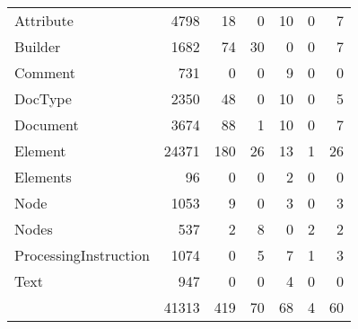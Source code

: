 \begin{tabular}{|l|r|r|r||r|r|r|}\hline
\typeHeading				& \successHeading & \failureHeading &\errorHeading &\successOnlyHeading	& \nonSuccessOnlyHeading 	& \mixedHeading\\\hline\hline
Attribute		& 4798	& 18	& 0	& 10	& 0	& 7\\\hline
Builder		& 1682	& 74	& 30	& 0	& 0	& 7\\\hline
Comment		& 731	& 0	& 0	& 9	& 0	& 0\\\hline
DocType		& 2350	& 48	& 0	& 10	& 0	& 5\\\hline
Document		& 3674	& 88	& 1	& 10	& 0	& 7\\\hline
Element		& 24371	& 180	& 26	& 13	& 1	& 26\\\hline
Elements		& 96	& 0	& 0	& 2	& 0	& 0\\\hline
Node		& 1053	& 9	& 0	& 3	& 0	& 3\\\hline
Nodes		& 537	& 2	& 8	& 0	& 2	& 2\\\hline
ProcessingInstruction		& 1074	& 0	& 5	& 7	& 1	& 3\\\hline
Text		& 947	& 0	& 0	& 4	& 0	& 0\\\hline
\hline
 & 41313 & 419 & 70 & 68 & 4 & 60\\\hline
\end{tabular}
